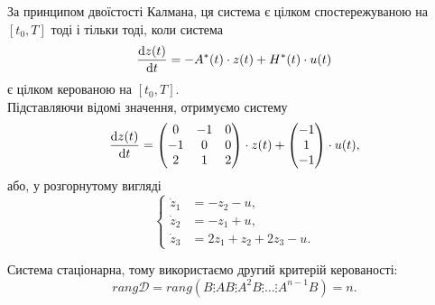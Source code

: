 \begin{solution}
	За принципом двоїстості Калмана, ця система є цілком спостережуваною на $[t_0, T]$ тоді і тільки тоді, коли система \[ \frac{\mathop{}\!\mathrm{d} z(t)}{\mathop{}\!\mathrm{d} t} = - A^*(t) \cdot z(t) + H^*(t) \cdot u(t) \] є цілком керованою на $[t_0, T]$. \\

	Підставляючи відомі значення, отримуємо систему \[ \frac{\mathop{}\!\mathrm{d} z(t)}{\mathop{}\!\mathrm{d} t} = \begin{pmatrix} 0 & -1 & 0 \\ -1 & 0 & 0 \\ 2 & 1 & 2 \end{pmatrix} \cdot z(t) + \begin{pmatrix} -1 \\ 1 \\ -1 \end{pmatrix} \cdot u(t), \] або, у розгорнутому вигляді \[ \left\{ \begin{aligned}
		\dot z_1 &= - z_2 - u, \\
		\dot z_2 &= - z_1 + u, \\
		\dot z_3 &= 2 z_1 + z_2 + 2 z_3 - u.
	\end{aligned} \right. \]

	Система стаціонарна, тому використаємо другий критерій керованості: \[ rang \mathcal{D} = rang \left(B \vdots AB \vdots A^2 B \vdots \ldots \vdots A^{n-1} B\right) = n. \]


\end{solution}
